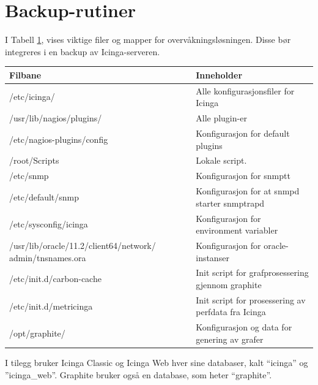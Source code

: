 \section{Backup-rutiner}
I Tabell \ref{backup}, vises viktige filer og mapper for overvåkningsløsningen. Disse bør integreres i en backup av Icinga-serveren.
\begin{table} \label{backup}
\begin{center}
\begin{tabular}{| p{8cm} | p{8cm} |}
 \hline
        \textbf{Filbane} & \textbf{Inneholder}
	\\ \hline
	/etc/icinga/ & Alle konfigurasjonsfiler for Icinga \\ \hline
	/usr/lib/nagios/plugins/ & Alle plugin-er \\ \hline
	/etc/nagios-plugins/config & Konfigurasjon for default plugins \\ \hline
	/root/Scripts & Lokale script. \\ \hline
	/etc/snmp & Konfigurasjon for snmptt \\ \hline
	/etc/default/snmp & Konfigurasjon for at snmpd starter snmptrapd \\ \hline
	/etc/sysconfig/icinga & Konfigurasjon for environment variabler \\ \hline
	/usr/lib/oracle/11.2/client64/network/
	admin/tnsnames.ora & Konfigurasjon for oracle-instanser \\ \hline
	/etc/init.d/carbon-cache & Init script for grafprosessering gjennom graphite \\ \hline
	/etc/init.d/metricinga & Init script for prosessering av perfdata fra Icinga \\ \hline
	/opt/graphite/ & Konfigurasjon og data for genering av grafer  \\ \hline
\end{tabular}
\end{center}
\end{table}
I tilegg bruker Icinga Classic og Icinga Web hver sine databaser, kalt ``icinga'' og ''icinga\_web''. Graphite bruker også en database, som heter ``graphite''.
